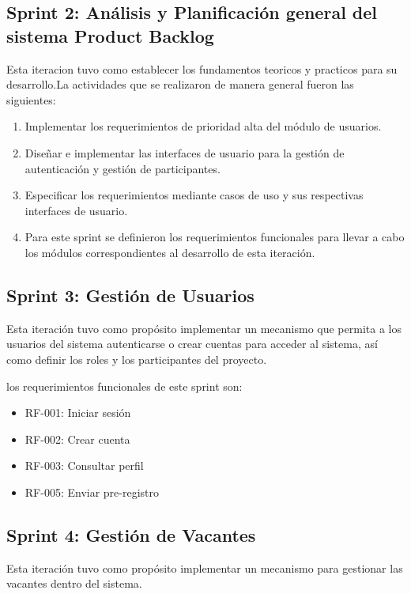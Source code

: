 \subsection{Sprint 2: Análisis y Planificación general del sistema Product Backlog}
Esta iteracion tuvo como establecer los fundamentos teoricos y practicos
para su desarrollo.La actividades que se realizaron de manera general fueron las siguientes:
\begin{enumerate}
    \item Implementar los requerimientos de prioridad alta del módulo de usuarios.
    \item Diseñar e implementar las interfaces de usuario para la gestión de autenticación y gestión de
    participantes.
    \item Especificar los requerimientos mediante casos de uso y sus respectivas interfaces de usuario.
    \item Para este sprint se definieron los requerimientos funcionales para llevar a cabo los módulos
    correspondientes al desarrollo de esta iteración.
\end{enumerate} 

\subsection{Sprint 3: Gestión de Usuarios}
Esta iteración tuvo como propósito implementar un mecanismo que permita a
los usuarios del sistema autenticarse o crear cuentas para acceder al sistema, así como definir los
roles y los participantes del proyecto.


los requerimientos funcionales de este sprint son:

\begin{itemize}
    \item RF-001: Iniciar sesión
    \item RF-002: Crear cuenta
    \item RF-003: Consultar perfil
    \item RF-005: Enviar pre-registro
\end{itemize}



\subsection{Sprint 4: Gestión de Vacantes}

Esta iteración tuvo como propósito implementar un mecanismo para gestionar las vacantes dentro del sistema.


